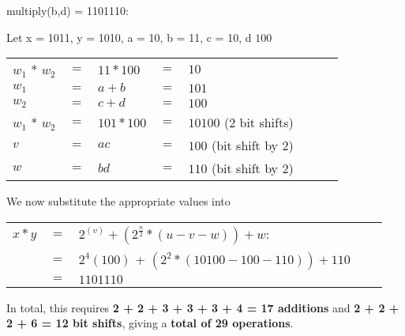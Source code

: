 \documentclass{article}
\begin{document}
multiply(b,d) = 1101110:
\begin{center}
Let x = 1011, y = 1010, a = 10, b = 11, c = 10, d $100$ \\
		
	\begin{tabular} {l l l l l l l l}
		\\$w_1$ * $w_2$ &$=$ &$11 * 100$  &$=$ &$10$\\
		$w_1$ 		    &$=$ &$a + b$     &$=$ &$101$\\
		$w_2$  		    &$=$ &$c + d$     &$=$ &$100$ \\
		$w_1$ * $w_2$   &$=$ &$101 * 100$ &$=$ &$10100$ (2 bit shifts)\\
		$v$ 		    &$=$ &$ac$ 		&$=$ &$100$ (bit shift by 2)\\
		$w$ 		    &$=$ &$bd$ 		&$=$ &$110$ (bit shift by 2)\\ 
	\end{tabular}
\end{center}
We now substitute the appropriate values into \\
\begin{center}
	\begin{tabular}{l l l l l}
		$x*y$ &$=$ &$2^(v) + (2^{\frac{n}{2}}* (u-v-w)) + w$: \\
			 &$=$ &$2^4(100)$ + $(2^2 * (10100 - 100 - 110)) + 110$ \\
			 &$=$ &$1101110$ \\
	\end{tabular}
\end{center}

In total, this requires \textbf{2 + 2 + 3 + 3 + 3 + 4 = 17 additions} and \textbf{2 + 2 + 2 + 6  = 12 bit shifts}, giving a \textbf{total of 29 operations}.
\end{document}
